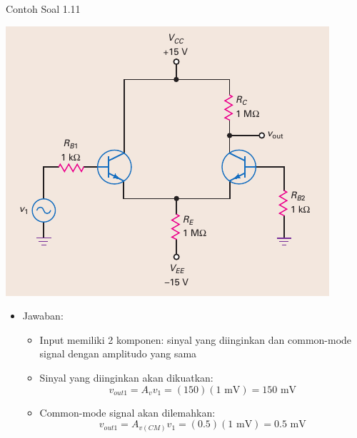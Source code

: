 \documentclass[aspectratio=169]{beamer}
\begin{document}
\begin{frame}{Contoh Soal 1.11}
	\begin{multicols}{2}
		\begin{center}
			\includegraphics[height=0.7\textheight]{gambar/01.fig22}
		\end{center}
		\columnbreak
		\begin{itemize}
			\item Jawaban:
			\begin{itemize}
				\item Input memiliki 2 komponen: sinyal yang diinginkan dan common-mode signal dengan amplitudo yang sama
				\item Sinyal yang diinginkan akan dikuatkan:
				\[ v_{out1} = A_v v_1 = (150)(1 \text{ mV}) = 150 \text{ mV} \]
				\item Common-mode signal akan dilemahkan:
				\[ v_{out1} = A_{v(CM)} v_1 = (0.5)(1 \text{ mV}) = 0.5 \text{ mV} \]
			\end{itemize}
		\end{itemize}
	\end{multicols}
\end{frame}
\end{document}
